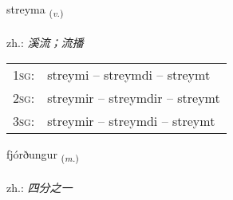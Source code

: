 \documentclass[frontgrid, backgrid]{flacards}\usepackage[]{graphicx}\usepackage[]{xcolor}
\begin{document}
\renewcommand{\flhead}{\vskip5pt \fboxsep=0pt {\small\bfseries\footnotesize Sagnorð | 动词}}
\renewcommand{\fcfoot}{\vskip5pt \fboxsep=0pt \hspace{2pt}{\small\bfseries\footnotesize 3K}}

\renewcommand{\blhead}{\vskip5pt {\small\bfseries\footnotesize Sagnorð | 动词 }}
\renewcommand{\bcfoot}{\vskip5pt \hspace{2pt}{\small\bfseries\footnotesize 3K}}


{streyma \small{\textsubscript{(\textit{v.})}} \\[1ex] %
\textphonetic{[streiːma]} \\
zh.: \emph{溪流；流播} \\  [2ex]
\renewcommand*{\arraystretch}{0.8}
\begin{tabular}{p{1cm}l}
\textsc{1sg}: & streymi -- streymdi -- streymt \\ 
\textsc{2sg}: & streymir -- streymdir -- streymt \\ 
\textsc{3sg}: & streymir -- streymdi -- streymt \\ 
\end{tabular}
}

\renewcommand{\flhead}{\vskip5pt \fboxsep=0pt {\small\bfseries\footnotesize Nafnorð | 名词}}
\renewcommand{\fcfoot}{\vskip5pt \fboxsep=0pt \hspace{2pt}{\small\bfseries\footnotesize 3K}}

\renewcommand{\blhead}{\vskip5pt {\small\bfseries\footnotesize Nafnorð | 名词 }}
\renewcommand{\bcfoot}{\vskip5pt \hspace{2pt}{\small\bfseries\footnotesize 3K}}


{fjórðungur \small{\textsubscript{(\textit{m.})}} \\[1ex] %
\textphonetic{[fjourðuŋkʏr]} \\
zh.: \emph{四分之一} \\  [2ex]
\renewcommand*{\arraystretch}{0.8}
}
\end{document}
